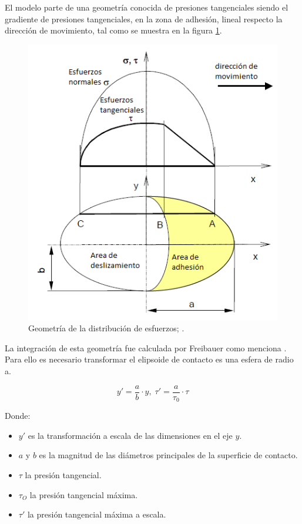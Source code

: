 \documentclass[main]{subfiles}
\begin{document}
El modelo \citet{Polach1999} parte de una geometría conocida de presiones tangenciales siendo el gradiente de presiones tangenciales, en la zona de adhesión, lineal respecto la dirección de movimiento, tal como se muestra en la figura \ref{fig:Polach}.

\begin{figure}[!htbp]
\centering
    \includegraphics[scale=0.7]{Polach1.png}
  \caption{Geometría de la distribución de esfuerzos; \citet{Polach1999}.}
  \label{fig:Polach}
\end{figure}  

La integración de esta geometría fue calculada por Freibauer como menciona \citet{Polach1999}. Para ello es necesario transformar el elipsoide de contacto es una esfera de radio a.

\begin{equation}
y'=\frac{a}{b}\cdot y, \; \tau'=\frac{a}{\tau_0}\cdot \tau
\end{equation}

\par \hspace{1cm}
\begin{minipage}{10cm}
\begin{spacing}{0.5}
Donde:
\begin{itemize}
\item  $y'$ es la transformación a escala de las dimensiones en el eje $y$.
\item $a$ y $b$ es la magnitud de las diámetros principales de la superficie de contacto.
\item $\tau$ la presión tangencial.
\item $\tau_O$ la presión tangencial máxima.
\item $\tau'$ la presión tangencial máxima a escala.
\end{itemize}
\end{spacing}
\end{minipage}
\end{document}
